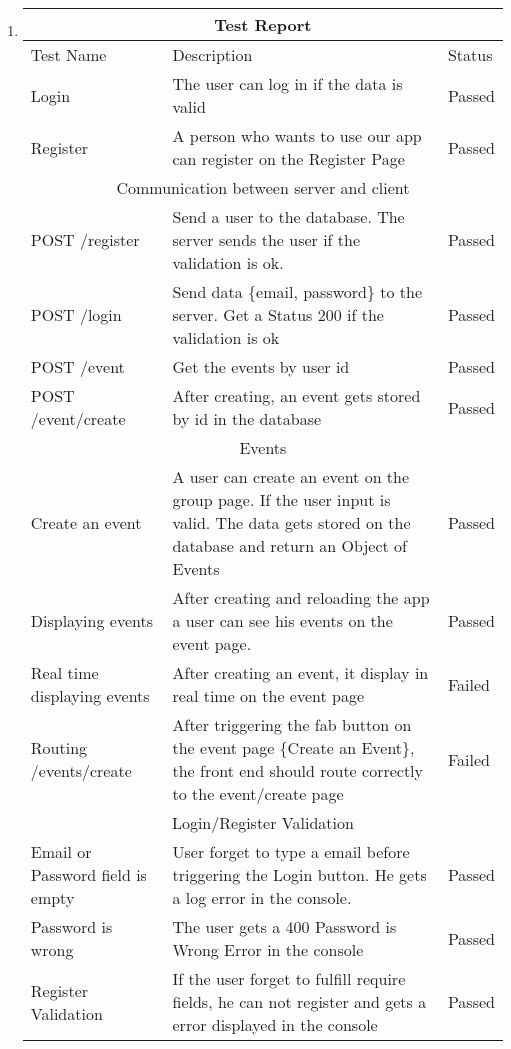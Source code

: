 \begin{enumerate}
\item
\begin{tabular}{ |p{3cm}||p{9cm}|p{1.5cm}|  }
\hline
\multicolumn{3}{|c|}{Test Report} \\
\hline
Test Name & Description & Status \\
\hline
Login & The user can log in if the data is valid & Passed \\
\hline
Register & A person who wants to use our app can register on the Register Page & Passed \\
\hline
\multicolumn{3}{|c|}{Communication between server and client} \\
\hline
POST /register & Send a user to the database. The server sends the user if the validation is ok. & Passed \\
\hline
POST /login & Send data \{email, password\} to the server. Get a Status 200 if the validation is ok & Passed \\
\hline
POST /event & Get the events by user id & Passed \\
\hline
POST /event/create & After creating, an event gets stored by id in the database & Passed \\
\hline
\multicolumn{3}{|c|}{Events} \\
\hline
Create an event & A user can create an event on the group page. If the user input is valid. The data gets stored on the database and return an Object of Events & Passed \\
\hline
Displaying events & After creating and reloading the app a user can see his events on the event page. & Passed \\
\hline
Real time displaying events & After creating an event, it display in real time on the event page & Failed \\
\hline
Routing /events/create & After triggering the fab button on the event page \{Create an Event\}, the front end should route correctly to the event/create page & Failed \\
\hline
\multicolumn{3}{|c|}{Login/Register Validation} \\
\hline
Email or Password field is empty & User forget to type a email before triggering the Login button. He gets a log error in the console.& Passed \\
\hline
Password is wrong & The user gets a 400 Password is Wrong Error in the console & Passed \\
\hline
Register Validation & If the user forget to fulfill require fields, he can not register and gets a error displayed in the console & Passed \\
\hline

\end{tabular}
\end{enumerate}